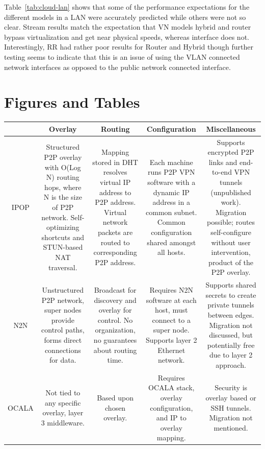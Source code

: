 Table~\ref{tab:cloud-lan} shows that some of the performance expectations
for the different models in a LAN were accurately predicted while others
were not so clear.  Stream results match the expectation that VN models hybrid
and router bypass virtualization and get near physical speeds, whereas interface
does not.  Interestingly, RR had rather poor results for Router and Hybrid
though further testing seems to indicate that this is an issue of using the
VLAN connected network interfaces as opposed to the public network connected
interface.

\section{Figures and Tables}

\begin{table}[ht]
\centering
\begin{tabular*}{0.75\textwidth}{|c||c|c|c|c|} \hline
& Overlay & Routing & Configuration & Miscellaneous \\ \hline\hline
IPOP
&
Structured P2P overlay with O(Log N) routing hops, where N is the size of P2P
network. Self-optimizing shortcuts and STUN-based NAT traversal.
&
Mapping stored in DHT resolves virtual IP address to P2P address. Virtual
network packets are routed to corresponding P2P address.
&
Each machine runs P2P VPN software with a dynamic IP address in a common subnet.
Common configuration shared amongst all hosts.
&
Supports encrypted P2P links and end-to-end VPN tunnels (unpublished work).
Migration possible; routes self-configure without user intervention, product of
the P2P overlay.
\\ \hline
N2N
&
Unstructured P2P network, super nodes provide control paths, forms direct
connections for data.
&
Broadcast for discovery and overlay for control.  No organization, no guarantees
about routing time.
&
Requires N2N software at each host, must connect to a super node.  Supports
layer 2 Ethernet network.
&
Supports shared secrets to create private tunnels between edges.  Migration not
discussed, but potentially free due to layer 2 approach.
\\ \hline
OCALA
&
Not tied to any specific overlay, layer 3 middleware.
&
Based upon chosen overlay.
&
Requires OCALA stack, overlay configuration, and IP to overlay mapping.
&
Security is overlay based or SSH tunnels.  Migration not mentioned.
\\ \hline

\end{tabular*}
\end{table}

